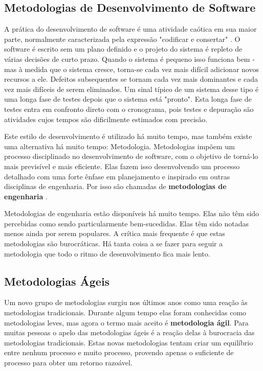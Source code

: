 \subsection{Metodologias de Desenvolvimento de Software}

A prática do desenvolvimento de software é uma atividade caótica em sua maior parte, normalmente caracterizada pela expressão "codificar e consertar" \cite{MartinFowler2005}. O software é escrito sem um plano definido e o projeto do sistema é repleto de várias decisões de curto prazo. Quando o sistema é pequeno isso funciona bem - mas à medida que o sistema cresce, torna-se cada vez mais difícil adicionar novos recursos a ele. Defeitos subsequentes se tornam cada vez mais dominantes e cada vez mais difíceis de serem eliminados. Um sinal típico de um sistema desse tipo é uma longa fase de testes depois que o sistema está "pronto". Esta longa fase de testes entra em confronto direto com o cronograma, pois testes e depuração são atividades cujos tempos são dificilmente estimados com precisão.

Este estilo de desenvolvimento é utilizado há muito tempo, mas também existe uma alternativa há muito tempo: Metodologia. Metodologias impõem um processo disciplinado no desenvolvimento de software, com o objetivo de torná-lo mais previsível e mais eficiente. Elas fazem isso desenvolvendo um processo detalhado com uma forte ênfase em planejamento e inspirado em outras disciplinas de engenharia. Por isso são chamadas de \textbf{metodologias de engenharia} \cite{MartinFowler2005}.

Metodologias de engenharia estão disponíveis há muito tempo. Elas não têm sido percebidas como sendo particularmente bem-sucedidas. Elas têm sido notadas menos ainda por serem populares. A crítica mais frequente é que estas metodologias são burocráticas. Há tanta coisa a se fazer para seguir a metodologia que todo o ritmo de desenvolvimento fica mais lento.

\subsection{Metodologias Ágeis}

Um novo grupo de metodologias surgiu nos últimos anos como uma reação às metodologias tradicionais. Durante algum tempo elas foram conhecidas como metodologias leves, mas agora o termo mais aceito é \textbf{metodologia ágil}. Para muitas pessoas o apelo das metodologias ágeis é a reação delas à burocracia das metodologias tradicionais. Estas novas metodologias tentam criar um equilíbrio entre nenhum processo e muito processo, provendo apenas o suficiente de processo para obter um retorno razoável.

